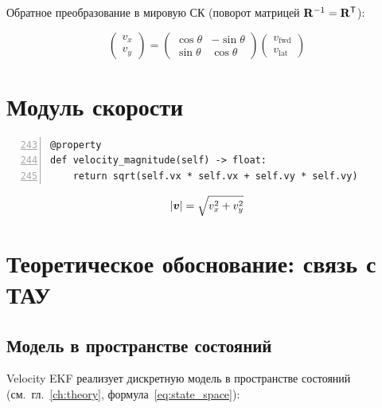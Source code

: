 Обратное преобразование в мировую СК (поворот матрицей $\mathbf{R}^{-1} = \mathbf{R}^{\mathsf{T}}$):

\begin{equation}
  \begin{pmatrix} v_x \\ v_y \end{pmatrix}
  = \begin{pmatrix} \cos\theta & -\sin\theta \\ \sin\theta & \cos\theta \end{pmatrix}
  \begin{pmatrix} v_{\text{fwd}} \\ v_{\text{lat}} \end{pmatrix}
  \label{eq:rot_back}
\end{equation}

\section{Модуль скорости}

\begin{filebox}[title={\filepath{velocity\_ekf.py}, строки 243--245}]
\begin{lstlisting}[style=pythonstyle, numbers=left, firstnumber=243]
@property
def velocity_magnitude(self) -> float:
    return sqrt(self.vx * self.vx + self.vy * self.vy)
\end{lstlisting}
\end{filebox}

\begin{equation}
  |\bm{v}| = \sqrt{v_x^2 + v_y^2}
  \label{eq:vmag}
\end{equation}

\section{Теоретическое обоснование: связь с ТАУ}

\subsection{Модель в пространстве состояний}

Velocity EKF реализует дискретную модель в пространстве состояний
(см.\ гл.~\ref{ch:theory}, формула~\eqref{eq:state_space}):

